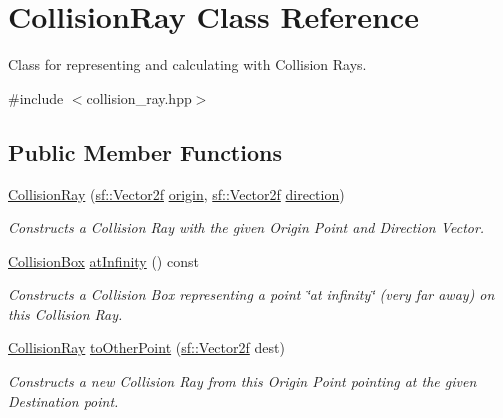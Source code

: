 \hypertarget{class_collision_ray}{}\section{Collision\+Ray Class Reference}
\label{class_collision_ray}


Class for representing and calculating with Collision Rays.  




{\ttfamily \#include $<$collision\+\_\+ray.\+hpp$>$}

\subsection*{Public Member Functions}
\begin{DoxyCompactItemize}
\item 
\mbox{\hyperlink{class_collision_ray_a18f283d76676ebaed3d892a770e23082}{Collision\+Ray}} (\mbox{\hyperlink{classsf_1_1_vector2}{sf\+::\+Vector2f}} \mbox{\hyperlink{class_collision_ray_a276b29e9423edf7a637c40dc8b51c068}{origin}}, \mbox{\hyperlink{classsf_1_1_vector2}{sf\+::\+Vector2f}} \mbox{\hyperlink{class_collision_ray_a81497ff5abbca7a84761cd4bf912af0b}{direction}})
\begin{DoxyCompactList}\small\item\em Constructs a Collision Ray with the given Origin Point and Direction Vector. \end{DoxyCompactList}\item 
\mbox{\label{class_collision_ray_aaa6d117c6410976c6b6e816001794895}} 
\mbox{\hyperlink{class_collision_box}{Collision\+Box}} \mbox{\hyperlink{class_collision_ray_aaa6d117c6410976c6b6e816001794895}{at\+Infinity}} () const
\begin{DoxyCompactList}\small\item\em Constructs a Collision Box representing a point \char`\"{}at infinity\char`\"{} (very far away) on this Collision Ray. \end{DoxyCompactList}\item 
\mbox{\hyperlink{class_collision_ray}{Collision\+Ray}} \mbox{\hyperlink{class_collision_ray_a15dc043afc5bb58bbad5b1570070b5df}{to\+Other\+Point}} (\mbox{\hyperlink{classsf_1_1_vector2}{sf\+::\+Vector2f}} dest)
\begin{DoxyCompactList}\small\item\em Constructs a new Collision Ray from this Origin Point pointing at the given Destination point. \end{DoxyCompactList}\item 

\end{DoxyCompactItemize}
